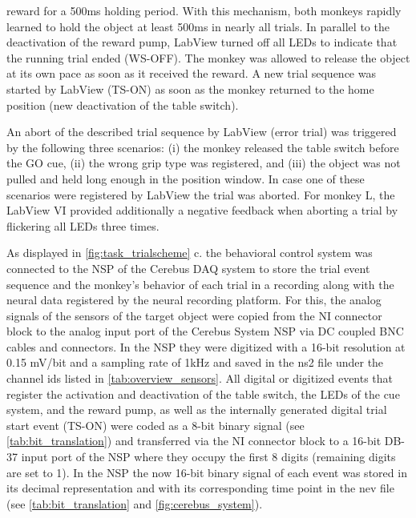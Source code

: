 reward for a 500ms holding period. With this mechanism, both monkeys rapidly learned to hold the object at least 500ms in nearly all trials. In parallel to the deactivation of the reward pump, LabView turned off all LEDs to indicate that the running trial ended (WS-OFF). The monkey was allowed to release the object at its own pace as soon as it received the reward. A new trial sequence was started by LabView (TS-ON) as soon as the monkey returned to the home position (new deactivation of the table switch).

An abort of the described trial sequence by LabView (error trial) was triggered by the following three scenarios: (i) the monkey released the table switch before the GO cue, (ii) the wrong grip type was registered, and (iii) the object was not pulled and held long enough in the position window. In case one of these scenarios were registered by LabView the trial was aborted. For monkey L, the LabView VI provided additionally a negative feedback when aborting a trial by flickering all LEDs three times. 

As displayed in \cref{fig:task_trialscheme} c. the behavioral control system was connected to the NSP of the Cerebus DAQ system to store the trial event sequence and the monkey's behavior of each trial in a recording along with the neural data registered by the neural recording platform. For this, the analog signals of the sensors of the target object were copied from the NI connector block to the analog input port of the Cerebus System NSP via DC coupled BNC cables and connectors. In the NSP they were digitized with a 16-bit resolution at 0.15 mV/bit and a sampling rate of 1kHz and saved in the ns2 file under the channel ids listed in \cref{tab:overview_sensors}. All digital or digitized events that register the activation and deactivation of the table switch, the LEDs of the cue system, and the reward pump, as well as the internally generated digital trial start event (TS-ON) were coded as a 8-bit binary signal (see \cref{tab:bit_translation}) and transferred via the NI connector block to a 16-bit DB-37 input port of the NSP where they occupy the first 8 digits (remaining digits are set to 1). In the NSP the now 16-bit binary signal of each event was stored in its decimal representation and with its corresponding time point in the nev file (see \cref{tab:bit_translation} and \cref{fig:cerebus_system}).


